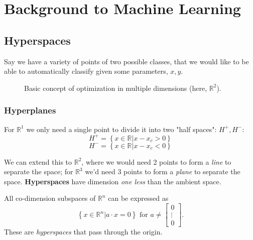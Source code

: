 \chapter{Background to Machine Learning}
\section{Hyperspaces}
Say we have a variety of points of two possible classes, that we would like to be able to automatically classify given some parameters, \(x,y\). 

\begin{figure}[H]
  \centering
  \caption{Basic concept of optimization in multiple dimensions (here, \(\mathbb{R}^2\)).}
  \label{fig:basicopt}
\end{figure}

\subsection{Hyperplanes}
For \(\mathbb{R}^1\) we only need a single point to divide it into two "half spaces": \(H^+, H^-\):
\[
  H^+=\left\{ x \in \mathbb{R} | x-x_c > 0 \right\} 
\]
\[
  H^-=\left\{ x \in \mathbb{R} | x-x_c < 0 \right\} 
\]

We can extend this to \(\mathbb{R}^2\), where we would need 2 points to form a \emph{line} to separate the space; for \(\mathbb{R}^3\) we'd need 3 points to form a \emph{plane} to separate the space. \textbf{Hyperspaces} have dimension \emph{one less} than the ambient space.

\begin{lemma}
  All co-dimension subspaces of \(\mathbb{R} ^n\) can be expressed as
  \[
    \left\{ x \in \mathbb{R} ^n | a \cdot x = 0 \right\} \text{ for } a \neq
    \begin{bmatrix}
      0 \\
      \vdots \\
      0
    \end{bmatrix}.
  \]
  These are \emph{hyperspaces} that pass through the origin.
\end{lemma}

